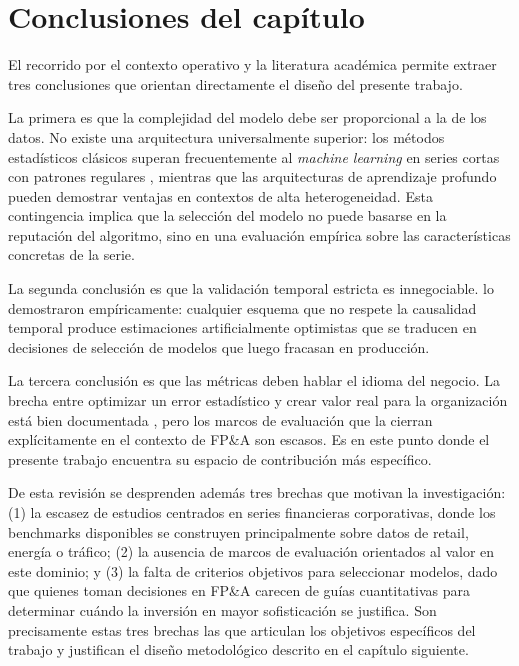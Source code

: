 \section{Conclusiones del capítulo}
\label{sec:conclusiones_cap2}

El recorrido por el contexto operativo y la literatura académica permite extraer tres conclusiones que orientan directamente el diseño del presente trabajo.

La primera es que la complejidad del modelo debe ser proporcional a la de los datos. No existe una arquitectura universalmente superior: los métodos estadísticos clásicos superan frecuentemente al \textit{machine learning} en series cortas con patrones regulares \parencite{Makridakis2022, Cerqueira2022}, mientras que las arquitecturas de aprendizaje profundo pueden demostrar ventajas en contextos de alta heterogeneidad. Esta contingencia implica que la selección del modelo no puede basarse en la reputación del algoritmo, sino en una evaluación empírica sobre las características concretas de la serie.

La segunda conclusión es que la validación temporal estricta es innegociable. \textcite{Bergmeir2012} lo demostraron empíricamente: cualquier esquema que no respete la causalidad temporal produce estimaciones artificialmente optimistas que se traducen en decisiones de selección de modelos que luego fracasan en producción.

La tercera conclusión es que las métricas deben hablar el idioma del negocio. La brecha entre optimizar un error estadístico y crear valor real para la organización está bien documentada \parencite{Armstrong2001, Makridakis2025M6}, pero los marcos de evaluación que la cierran explícitamente en el contexto de FP\&A son escasos. Es en este punto donde el presente trabajo encuentra su espacio de contribución más específico.

De esta revisión se desprenden además tres brechas que motivan la investigación: (1) la escasez de estudios centrados en series financieras corporativas, donde los benchmarks disponibles se construyen principalmente sobre datos de retail, energía o tráfico; (2) la ausencia de marcos de evaluación orientados al valor en este dominio; y (3) la falta de criterios objetivos para seleccionar modelos, dado que quienes toman decisiones en FP\&A carecen de guías cuantitativas para determinar cuándo la inversión en mayor sofisticación se justifica. Son precisamente estas tres brechas las que articulan los objetivos específicos del trabajo y justifican el diseño metodológico descrito en el capítulo siguiente.
